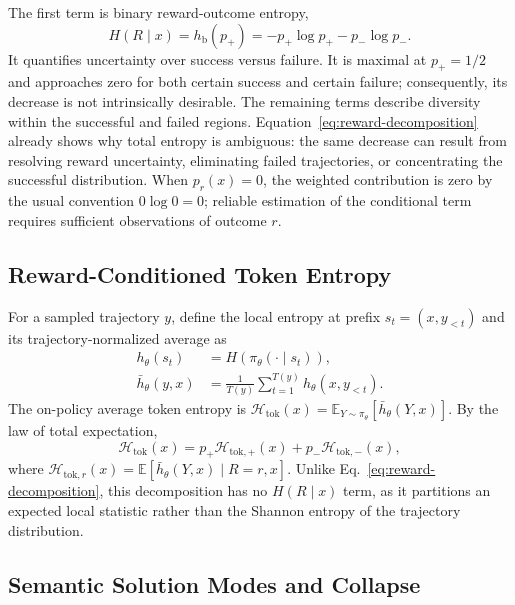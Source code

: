 \documentclass[letterpaper]{article} %
\begin{document}
The first term is binary reward-outcome entropy,
\[
H(R\mid x)=h_{\mathrm b}(p_+)=-p_+\log p_+-p_-\log p_-.
\]
It quantifies uncertainty over success versus failure. It is maximal at \(p_+=1/2\) and approaches zero for both certain success and certain failure; consequently, its decrease is not intrinsically desirable. The remaining terms describe diversity within the successful and failed regions. Equation~\eqref{eq:reward-decomposition} already shows why total entropy is ambiguous: the same decrease can result from resolving reward uncertainty, eliminating failed trajectories, or concentrating the successful distribution.
When \(p_r(x)=0\), the weighted contribution is zero by the usual convention \(0\log 0=0\); reliable estimation of the conditional term requires sufficient observations of outcome \(r\).

\subsection{Reward-Conditioned Token Entropy}

For a sampled trajectory \(y\), define the local entropy at prefix \(s_t=(x,y_{<t})\) and its trajectory-normalized average as
\begin{equation}
    \begin{aligned}
        h_\theta(s_t)&=H\!\left(\pi_\theta(\cdot\mid s_t)\right),\\
        \bar h_\theta(y,x)&=\frac{1}{T(y)}\sum_{t=1}^{T(y)}h_\theta(x,y_{<t}).
    \end{aligned}
    \label{eq:local-token-entropy}
\end{equation}
The on-policy average token entropy is
\(\mathcal H_{\mathrm{tok}}(x)=
\mathbb{E}_{Y\sim\pi_\theta}[\bar h_\theta(Y,x)]\).
By the law of total expectation,
\begin{equation}
    \mathcal H_{\mathrm{tok}}(x)
    =p_+\mathcal H_{\mathrm{tok},+}(x)
    +p_-\mathcal H_{\mathrm{tok},-}(x),
    \label{eq:token-decomposition}
\end{equation}
where
\(\mathcal H_{\mathrm{tok},r}(x)=
\mathbb{E}[\bar h_\theta(Y,x)\mid R=r,x]\).
Unlike Eq.~\eqref{eq:reward-decomposition}, this decomposition has no \(H(R\mid x)\) term, as it partitions an expected local statistic rather than the Shannon entropy of the trajectory distribution.

\subsection{Semantic Solution Modes and Collapse}
\end{document}
